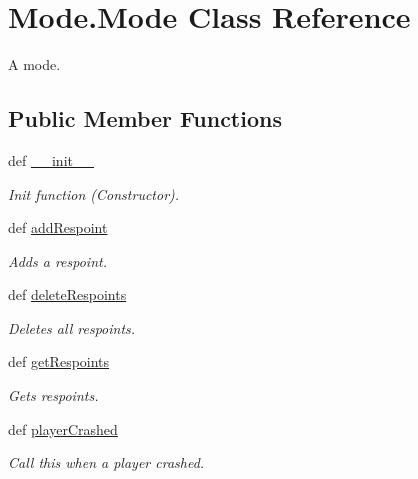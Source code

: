 \hypertarget{class_mode_1_1_mode}{
\section{Mode.Mode Class Reference}
\label{class_mode_1_1_mode}
}


A mode.  


\subsection*{Public Member Functions}
\begin{DoxyCompactItemize}
\item 
def \hyperlink{class_mode_1_1_mode_add2325e8a6bf4ff3aacb7c1dd3299e5a}{\_\-\_\-init\_\-\_\-}
\begin{DoxyCompactList}\small\item\em Init function (Constructor). \item\end{DoxyCompactList}\item 
def \hyperlink{class_mode_1_1_mode_a48c269456fe39631862a8be79627b0e5}{addRespoint}
\begin{DoxyCompactList}\small\item\em Adds a respoint. \item\end{DoxyCompactList}\item 
def \hyperlink{class_mode_1_1_mode_a098cfc6ad819a1db17be57c9548bd199}{deleteRespoints}
\begin{DoxyCompactList}\small\item\em Deletes all respoints. \item\end{DoxyCompactList}\item 
def \hyperlink{class_mode_1_1_mode_a1f3ca2f4e28ef874943310e4397f6ac2}{getRespoints}
\begin{DoxyCompactList}\small\item\em Gets respoints. \item\end{DoxyCompactList}\item 
def \hyperlink{class_mode_1_1_mode_a68362e7b1cdd6ee60378f3cc1322a144}{playerCrashed}
\begin{DoxyCompactList}\small\item\em Call this when a player crashed. \item\end{DoxyCompactList}\item 

\end{DoxyCompactItemize}
